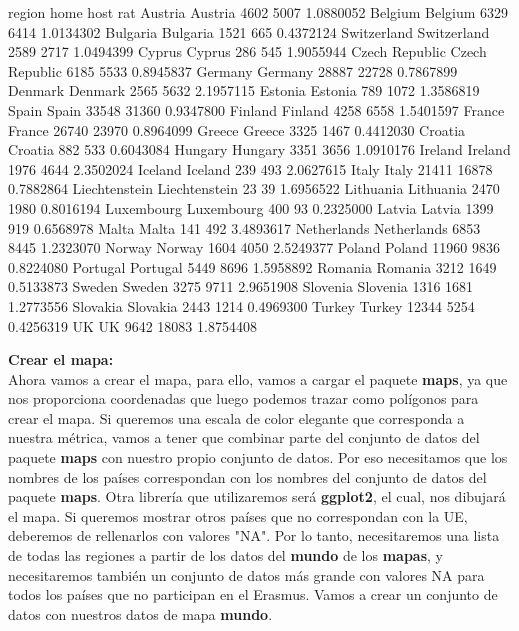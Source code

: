 \documentclass [a4paper] {article}
\begin{document}
\begin{Schunk}
\begin{Soutput}
                       region  home  host       rat
Austria               Austria  4602  5007 1.0880052
Belgium               Belgium  6329  6414 1.0134302
Bulgaria             Bulgaria  1521   665 0.4372124
Switzerland       Switzerland  2589  2717 1.0494399
Cyprus                 Cyprus   286   545 1.9055944
Czech Republic Czech Republic  6185  5533 0.8945837
Germany               Germany 28887 22728 0.7867899
Denmark               Denmark  2565  5632 2.1957115
Estonia               Estonia   789  1072 1.3586819
Spain                   Spain 33548 31360 0.9347800
Finland               Finland  4258  6558 1.5401597
France                 France 26740 23970 0.8964099
Greece                 Greece  3325  1467 0.4412030
Croatia               Croatia   882   533 0.6043084
Hungary               Hungary  3351  3656 1.0910176
Ireland               Ireland  1976  4644 2.3502024
Iceland               Iceland   239   493 2.0627615
Italy                   Italy 21411 16878 0.7882864
Liechtenstein   Liechtenstein    23    39 1.6956522
Lithuania           Lithuania  2470  1980 0.8016194
Luxembourg         Luxembourg   400    93 0.2325000
Latvia                 Latvia  1399   919 0.6568978
Malta                   Malta   141   492 3.4893617
Netherlands       Netherlands  6853  8445 1.2323070
Norway                 Norway  1604  4050 2.5249377
Poland                 Poland 11960  9836 0.8224080
Portugal             Portugal  5449  8696 1.5958892
Romania               Romania  3212  1649 0.5133873
Sweden                 Sweden  3275  9711 2.9651908
Slovenia             Slovenia  1316  1681 1.2773556
Slovakia             Slovakia  2443  1214 0.4969300
Turkey                 Turkey 12344  5254 0.4256319
UK                         UK  9642 18083 1.8754408
\end{Soutput}
\end{Schunk}

\textbf{Crear el mapa:}\\
Ahora vamos a crear el mapa, para ello, vamos a cargar el paquete \textbf{maps}, ya que
nos proporciona coordenadas que luego podemos trazar como polígonos para crear el mapa.
Si queremos una escala de color elegante que corresponda a nuestra métrica, vamos a tener 
que combinar parte del conjunto de datos del paquete \textbf{maps} con nuestro propio 
conjunto de datos. Por eso necesitamos que los nombres de los países correspondan con los 
nombres del conjunto de datos del paquete \textbf{maps}. Otra librería que utilizaremos será
\textbf{ggplot2}, el cual, nos dibujará el mapa. Si queremos mostrar otros países que no 
correspondan con la UE, deberemos de rellenarlos con valores "NA". Por lo tanto, necesitaremos
una lista de todas las regiones a partir de los datos del \textbf{mundo} de los \textbf{mapas},
y necesitaremos también un conjunto de datos más grande con valores NA para todos los países que
no participan en el Erasmus. Vamos a crear un conjunto de datos con nuestros datos de mapa 
\textbf{mundo}.
\end{document}
